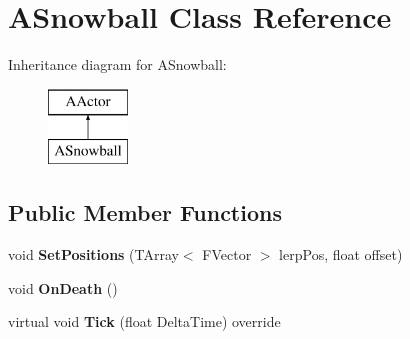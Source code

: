 \hypertarget{class_a_snowball}{}\section{A\+Snowball Class Reference}
\label{class_a_snowball}
Inheritance diagram for A\+Snowball\+:\begin{figure}[H]
\begin{center}
\leavevmode
\includegraphics[height=2.000000cm]{class_a_snowball}
\end{center}
\end{figure}
\subsection*{Public Member Functions}
\begin{DoxyCompactItemize}
\item 
\mbox{\label{class_a_snowball_aa413616dcb4fdff34ab8c543f6bca7fe}} 
void {\bfseries Set\+Positions} (T\+Array$<$ F\+Vector $>$ lerp\+Pos, float offset)
\item 
\mbox{\label{class_a_snowball_abdd53cf202d12fc2c5f120c9c23d77d5}} 
void {\bfseries On\+Death} ()
\item 
\mbox{\label{class_a_snowball_a64d038ba27c2390cbd101505690a8e51}} 
virtual void {\bfseries Tick} (float Delta\+Time) override
\end{DoxyCompactItemize}
